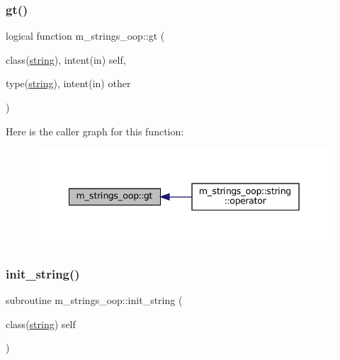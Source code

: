 \subsubsection{\texorpdfstring{gt()}{gt()}}
{\footnotesize\ttfamily logical function m\+\_\+strings\+\_\+oop\+::gt (\begin{DoxyParamCaption}\item[{class(\mbox{\hyperlink{structm__strings__oop_1_1string}{string}}), intent(in)}]{self,  }\item[{type(\mbox{\hyperlink{structm__strings__oop_1_1string}{string}}), intent(in)}]{other }\end{DoxyParamCaption})\hspace{0.3cm}{\ttfamily [private]}}

Here is the caller graph for this function\+:\nopagebreak
\begin{figure}[H]
\begin{center}
\leavevmode
\includegraphics[width=342pt]{namespacem__strings__oop_a25beb184587d7c9fc0a3fd846d4ce187_icgraph}
\end{center}
\end{figure}
\mbox{\label{namespacem__strings__oop_a1510c1de10cb182598ce6a399a734be0}} 
\subsubsection{\texorpdfstring{init\+\_\+string()}{init\_string()}}
{\footnotesize\ttfamily subroutine m\+\_\+strings\+\_\+oop\+::init\+\_\+string (\begin{DoxyParamCaption}\item[{class(\mbox{\hyperlink{structm__strings__oop_1_1string}{string}})}]{self }\end{DoxyParamCaption})\hspace{0.3cm}{\ttfamily [private]}}

\mbox{\label{namespacem__strings__oop_a103e7c1fab92a1c4cbfff87ec8cd1e23}} 

